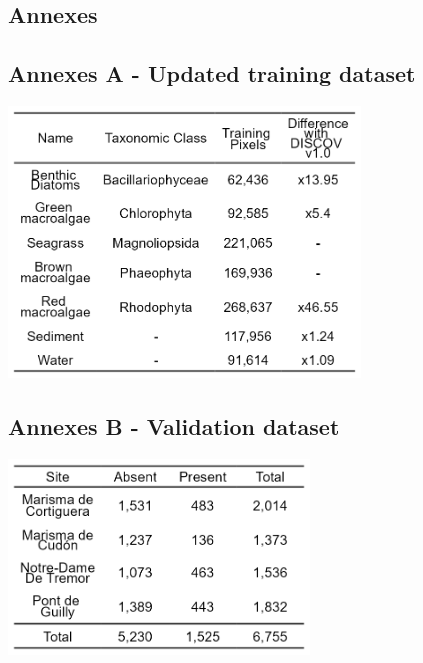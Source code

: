 \documentclass[
  letterpaper,
  11pt,
  english,
  singlespacing,
  headsepline]{MastersDoctoralThesis}
\begin{document}
\begin{spacing}{1.5}
\newpage

\section{Annexes}\label{annexes}

\subsection{Annexes A - Updated training dataset}\label{sec-AnnexeA}

\centering
\begin{table}
  \centering
  \includegraphics[width=0.7\textwidth]{Chapter4/Figs/AnnexeA.png}
  \caption{\label{tbl-Update_training}Annexe 4.1 - Class of the Neural Network model, with the number of training pixels used to train that class and the differences with the training dataset of DISCOV v1.0}
\end{table}

\newpage

\subsection{Annexes B - Validation dataset}\label{sec-AnnexeB}

\centering
\begin{table}
  \centering
  \includegraphics[width=0.6\textwidth]{Chapter4/Figs/AnnexeB.png}
  \caption{\label{tbl-ValidationDataset}Annexe 4.2 - Presence and absence of red macroalgae for each drone flight}
\end{table}


\end{spacing}
\end{document}
